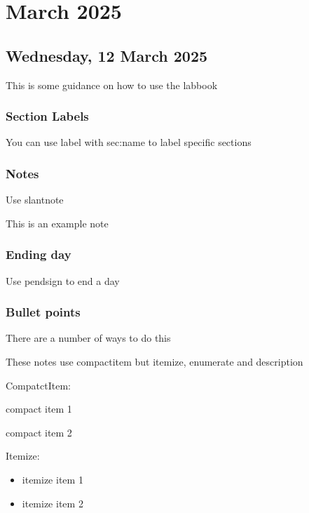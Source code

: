 \chapter[2025 March]{March 2025}

\section[2025/03/12]{Wednesday, 12 March 2025}
\label{sec:20250312}

This is some guidance on how to use the labbook

\subsection{Section Labels}

You can use label with sec:name to label specific sections

\subsection{Notes}

Use slantnote

\begin{slantnote}
	This is an example note
\end{slantnote}

\subsection{Ending day}

Use pendsign to end a day

\subsection{Bullet points}

There are a number of ways to do this

These notes use compactitem but itemize, enumerate and description

CompatctItem:

\begin{compactitem}
	\item compact item 1
	\item compact item 2
\end{compactitem}

Itemize:

\begin{itemize}
	\item itemize item 1
	\item itemize item 2
\end{itemize}

